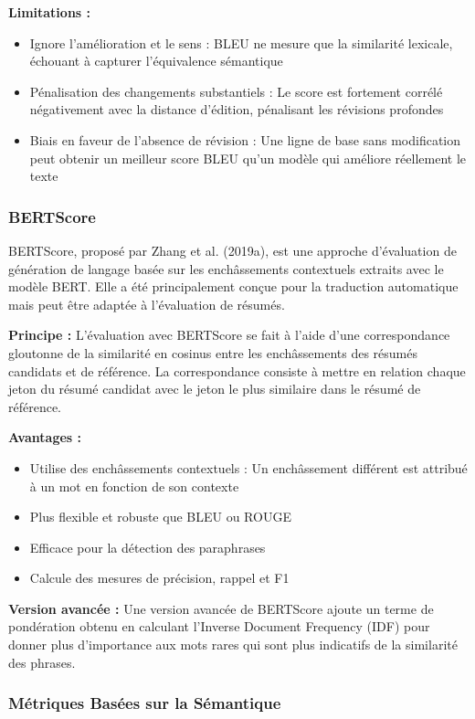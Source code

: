 \textbf{Limitations :}
\begin{itemize}
    \item Ignore l'amélioration et le sens : BLEU ne mesure que la similarité lexicale, échouant à capturer l'équivalence sémantique
    \item Pénalisation des changements substantiels : Le score est fortement corrélé négativement avec la distance d'édition, pénalisant les révisions profondes
    \item Biais en faveur de l'absence de révision : Une ligne de base sans modification peut obtenir un meilleur score BLEU qu'un modèle qui améliore réellement le texte
\end{itemize}

\subsubsection{BERTScore}

BERTScore, proposé par Zhang et al. (2019a), est une approche d'évaluation de génération de langage basée sur les enchâssements contextuels extraits avec le modèle BERT. Elle a été principalement conçue pour la traduction automatique mais peut être adaptée à l'évaluation de résumés.

\textbf{Principe :}
L'évaluation avec BERTScore se fait à l'aide d'une correspondance gloutonne de la similarité en cosinus entre les enchâssements des résumés candidats et de référence. La correspondance consiste à mettre en relation chaque jeton du résumé candidat avec le jeton le plus similaire dans le résumé de référence.

\textbf{Avantages :}
\begin{itemize}
    \item Utilise des enchâssements contextuels : Un enchâssement différent est attribué à un mot en fonction de son contexte
    \item Plus flexible et robuste que BLEU ou ROUGE
    \item Efficace pour la détection des paraphrases
    \item Calcule des mesures de précision, rappel et F1
\end{itemize}

\textbf{Version avancée :}
Une version avancée de BERTScore ajoute un terme de pondération obtenu en calculant l'Inverse Document Frequency (IDF) pour donner plus d'importance aux mots rares qui sont plus indicatifs de la similarité des phrases.

\subsubsection{Métriques Basées sur la Sémantique}

